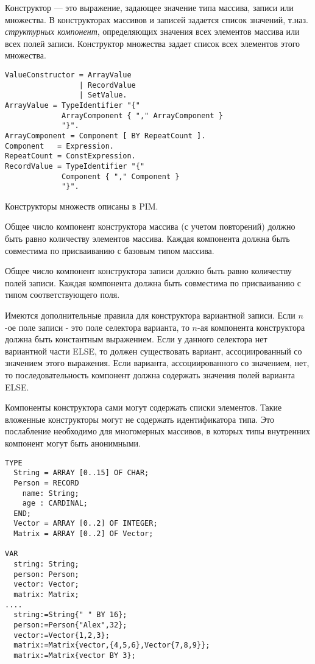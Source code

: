 Конструктор --- это выражение, задающее значение типа массива,
записи или множества. В конструкторах массивов и записей
задается список значений, т.наз. {\em структурных компонент}, 
определяющих значения всех элементов массива или всех полей записи.
Конструктор множества задает список всех элементов этого множества.

\begin{verbatim}
ValueConstructor = ArrayValue
                 | RecordValue
                 | SetValue.
ArrayValue = TypeIdentifier "{"
             ArrayComponent { "," ArrayComponent }
             "}".
ArrayComponent = Component [ BY RepeatCount ].
Component   = Expression.
RepeatCount = ConstExpression.
RecordValue = TypeIdentifier "{"
             Component { "," Component }
             "}".
\end{verbatim}
Конструкторы множеств описаны в PIM.

Общее число компонент конструктора массива (с учетом повторений)
должно быть равно количеству элементов массива. Каждая компонента
должна быть совместима по присваиванию с базовым типом массива.

Общее число компонент конструктора записи
должно быть равно количеству полей записи. Каждая компонента
должна быть совместима по присваиванию с типом соответствующего поля.

Имеются дополнительные правила для конструктора вариантной записи.
Если $n$-ое поле записи - это поле селектора варианта, %
то $n$-ая компонента конструктора должна быть константным выражением.
Если у данного селектора нет вариантной части ELSE,
то должен существовать вариант, ассоциированный со значением 
этого выражения. Если варианта, ассоциированного со значением, 
нет, то последовательность компонент должна содержать значения полей
варианта ELSE.

Компоненты конструктора сами могут содержать списки элементов.
Такие вложенные конструкторы могут не содержать идентификатора типа.
Это послабление необходимо для многомерных массивов, в которых
типы внутренних компонент могут быть анонимными.

\Examples
\begin{verbatim}
TYPE
  String = ARRAY [0..15] OF CHAR;
  Person = RECORD
    name: String;
    age : CARDINAL;
  END;
  Vector = ARRAY [0..2] OF INTEGER;
  Matrix = ARRAY [0..2] OF Vector;

VAR
  string: String;
  person: Person;
  vector: Vector;
  matrix: Matrix;
....
  string:=String{" " BY 16};
  person:=Person{"Alex",32};
  vector:=Vector{1,2,3};
  matrix:=Matrix{vector,{4,5,6},Vector{7,8,9}};
  matrix:=Matrix{vector BY 3};
\end{verbatim}

